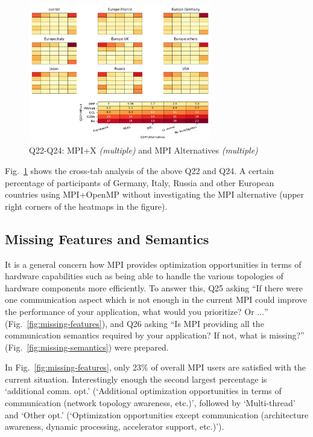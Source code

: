 \documentclass[conference,10pt,letterpaper]{IEEEtran}
\def\myquote#1{`#1'}
\begin{document}
\begin{figure}[htb]
\begin{center}
\includegraphics[width=8cm]{Figs/Q22-Q24.pdf}
\caption{Q22-Q24: MPI+X {\it(multiple)} and MPI Alternatives {\it(multiple)}}
\label{fig:mpi-x-and-alternatives}
\end{center}
\end{figure}

Fig.~\ref{fig:mpi-x-and-alternatives} shows the cross-tab analysis of
the above Q22 and Q24. A certain percentage of participants of
Germany, Italy, Russia and other European countries using MPI+OpenMP
without investigating the MPI alternative (upper right corners of the
heatmaps in the figure). 

\subsection{Missing Features and Semantics}

It is a general concern how MPI provides optimization
opportunities in terms of hardware capabilities such as being able to
handle the various topologies of hardware components more 
efficiently. To answer this, Q25 asking ``If there were one
communication aspect which is not enough in the current MPI could
improve the performance of your application, what would you
prioritize? Or $\ldots$'' (Fig.~\ref{fig:missing-features}), and Q26 asking
``Is MPI providing all the communication semantics required by your
application? If not, what is missing?''
(Fig.~\ref{fig:missing-semantics}) were prepared. 

In Fig.~\ref{fig:missing-features}, only 23\% of overall MPI users
are satisfied with the current situation.
Interestingly enough the second largest percentage is
\myquote{additional comm. opt.} (\myquote{Additional optimization
  opportunities in terms of communication (network topology awareness,
  etc.)}, followed by \myquote{Multi-thread} and \myquote{Other
  opt.} (\myquote{Optimization opportunities except communication
  (architecture awareness, dynamic processing, accelerator support,
  etc.)}). 
\end{document}
